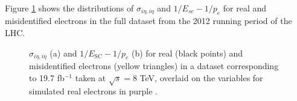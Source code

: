 Figure \ref{fig:ele_id_vars} shows the distributions of $\sigma_{i\eta,i\eta}$ and $1/E_{sc} - 1/p_e$ 
for real and misidentified electrons in the full dataset from the 2012 running period of the \ac{LHC}.

\begin{figure}
\begin{center}
\end{center}
\caption{$\sigma_{i\eta,i\eta}$ (a) and $1/E_{\text{SC}} - 1/p_{e}$ (b) for real (black points)  and 
misidentified electrons (yellow triangles) in a dataset corresponding to 19.7 fb$^{-1}$
taken at $\sqrt{s} = 8$ TeV, overlaid on the variables for simulated 
real electrons in purple \cite{cms-elereco-run1}.}
\label{fig:ele_id_vars}
\end{figure}

